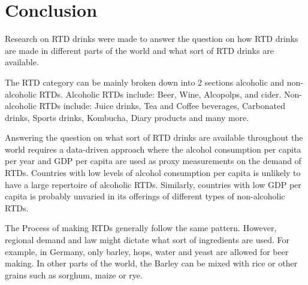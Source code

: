 \chapter{Conclusion}
\noindent
Research on RTD drinks were made to answer the question on how RTD drinks are made in different parts of the world and what sort of RTD drinks are available. \par

\vspace{0.3cm}
\noindent
The RTD category can be mainly broken down into 2 sections alcoholic and non-alcoholic RTDs. Alcoholic RTDs include: Beer, Wine, Alcopolps, and cider. Non-alcoholic RTDs include: Juice drinks, Tea and Coffee beverages, Carbonated drinks, Sports drinks, Kombucha, Diary products and many more.  \par

\vspace{0.3cm}
\noindent
Answering the question on what sort of RTD drinks are available throughout the world requires a data-driven approach where the alcohol consumption per capita per year and GDP per capita are used as proxy measurements on the demand of RTDs. Countries with low levels of alcohol consumption per capita is unlikely to have a large repertoire of alcoholic RTDs. Similarly, countries with low GDP per capita is probably unvaried in its offerings of different types of non-alcoholic RTDs. \par

\vspace{0.3cm}
\noindent
The Process of making RTDs generally follow the same pattern. However, regional demand and law might dictate what sort of ingredients are used. For example, in Germany, only barley, hops, water and yeast are allowed for beer making. In other parts of the world, the Barley can be mixed with rice or other grains such as sorghum, maize or rye. 